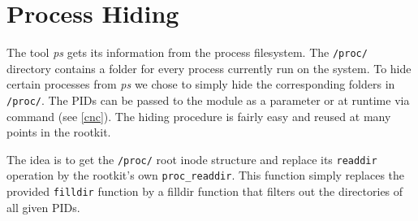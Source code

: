 \section{Process Hiding}
The tool \textit{ps} gets its information from the process filesystem. The 
\texttt{/proc/} directory contains a folder for every process 
currently run on the system. To hide certain processes from \textit{ps} we chose 
to simply hide the corresponding folders in \texttt{/proc/}. 
The PIDs can be passed to the module as a parameter or at runtime via command 
(see \ref{cnc}). The hiding procedure is fairly easy and reused at many points 
in the rootkit.

The idea is to get the \texttt{/proc/} root inode structure and replace its 
\texttt{readdir} operation by the rootkit's own
\texttt{proc\_readdir}. This function simply replaces the provided 
\texttt{filldir} function by a filldir function that filters out the 
directories of all given PIDs. 